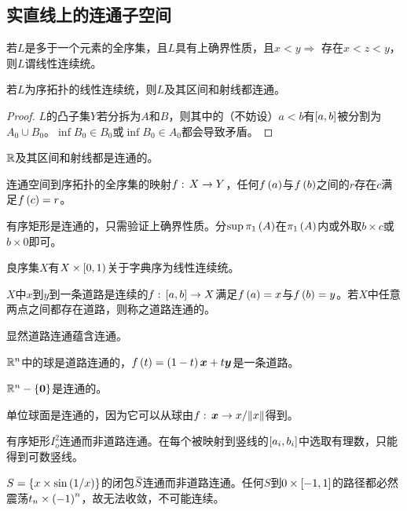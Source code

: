 \documentclass{ctexrep}
\begin{document}
  \subsection{实直线上的连通子空间}
  \begin{definition}
    若$L$是多于一个元素的全序集，且$L$具有上确界性质，且$x<y\Rightarrow$ 存在$x<z<y$，则$L$谓线性连续统。
  \end{definition}
  \begin{theorem}
    若$L$为序拓扑的线性连续统，则$L$及其区间和射线都连通。
  \end{theorem}
  \begin{proof}
    $L$的凸子集$Y$若分拆为$A$和$B$，则其中的（不妨设）$a<b$有$\left[a,b\right]$被分割为$A_0\cup B_0$。$\inf B_0 \in B_0$或$\inf B_0\in A_0$都会导致矛盾。
  \end{proof}
  \begin{corollary}
    $\mathbb{R}$及其区间和射线都是连通的。
  \end{corollary}
  \begin{theorem}[介值定理]
    \label{thm:interv}
    连通空间到序拓扑的全序集的映射$f:\, X \rightarrow Y$，任何$f\left(a\right)$与$f\left(b\right)$之间的$r$存在$c$满足$f\left(c\right)=r$。
  \end{theorem}
  \begin{ex}
    有序矩形是连通的，只需验证上确界性质。分$\sup \pi_1 \left(A\right)$在$\pi_1 \left(A\right)$内或外取$b\times c$或$b\times 0$即可。
  \end{ex}
  \begin{ex}
    良序集$X$有$X\times\left[0,1\right)$关于字典序为线性连续统。
  \end{ex}
  \begin{definition}
    $X$中$x$到$y$到一条道路是连续的$f:\, \left[a,b\right] \rightarrow X$满足$f\left(a\right)=x$与$f\left(b\right)=y$。若$X$中任意两点之间都存在道路，则称之道路连通的。
  \end{definition}
  显然道路连通蕴含连通。
  \begin{ex}
    $\mathbb{R}^n$中的球是道路连通的，$f\left(t\right)=\left(1-t\right)\boldsymbol{x}+t\boldsymbol{y}$是一条道路。
  \end{ex}
  \begin{ex}
    $\mathbb{R}^n-\left\{\boldsymbol{0}\right\}$是连通的。
  \end{ex}
  \begin{ex}
    单位球面是连通的，因为它可以从球由$f:\, \boldsymbol{x} \rightarrow x/\norm{x}$得到。
  \end{ex}
  \begin{ex}
    有序矩形$I_o^2$连通而非道路连通。在每个被映射到竖线的$\left[a_i,b_i\right]$中选取有理数，只能得到可数竖线。
  \end{ex}
  \begin{ex}
    $S=\left\{x\times \sin\left(1/x\right)\right\}$的闭包$\clo{S}$连通而非道路连通。任何$S$到$0\times\left[-1,1\right]$的路径都必然震荡$t_n \times \left(-1\right)^n$，故无法收敛，不可能连续。
  \end{ex}
\end{document}
